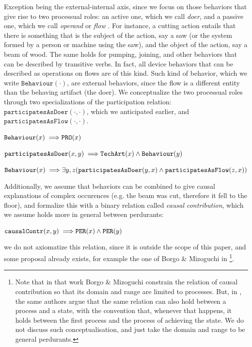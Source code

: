 \documentclass[sw]{iosart2x}
\newcommand{\bflist}{\begin{list}{}{\setlength{\topsep}{2mm}\setlength{\partopsep}{0mm}\setlength{\parsep}{0mm}\setlength{\leftmargin}{9mm}\setlength{\labelwidth}{8mm}}}
\newcommand{\eflist}{\end{list}}
\newcommand{\AxLabel}{\textrm{a}}
\newcounter{cntax}
\newcommand{\myax}[1]{\refstepcounter{cntax}\begin{small}{\bf \AxLabel\thecntax\label{ax:#1}}\end{small}}
\newcommand{\generalStyle}[1]{\texttt{#1}}
\newcommand{\biRel}[3]{\generalStyle{#1}(#2,#3)}
\newcommand{\uniRel}[2]{\generalStyle{#1}(#2)}
\newcommand{\myfi}{\hspace{0.9mm} \Longrightarrow}
\newcommand{\DOLCEProcess}[1]{\uniRel{PRO}{#1}}
\newcommand{\DOLCEPerdurant}[1]{\uniRel{{PER}}{#1}}
\newcommand{\TechArt}[1]{\uniRel{TechArt}{#1}}
\newcommand{\BehaviourConcrete}[1]{\uniRel{Behaviour}{#1}}
\newcommand{\causallyContr}[2]{\biRel{causalContr}{#1}{#2}}
\newcommand{\participateAsDoer}[2]{\biRel{participatesAsDoer}{#1}{#2}}
\newcommand{\participateAsFlow}[2]{\biRel{participatesAsFlow}{#1}{#2}}
\newcommand{\firstTimeKeyWord}[1]{\textit{#1}}
\begin{document}
Exception being the external-internal axis, since we focus on those behaviors that give rise to two processual roles: an active one, which we call \firstTimeKeyWord{doer}, and a passive one, which we call \firstTimeKeyWord{operand} or \firstTimeKeyWord{flow} \cite{pahl_engineering_2007}. 
For instance, a cutting action entails that there is something that is the subject of the action, say a saw (or the system formed by a person or machine using the saw), and the object of the action, say a beam of wood.
The same holds for pumping, joining, and other behaviors that can be described by transitive verbs. 
In fact, all device behaviors that can be described as operations on flows are of this kind. 
Such kind of behavior, which we write $\BehaviourConcrete{\cdot}$, are external behaviors, since the flow is a different entity than the behaving artifact (the doer).
We conceptualize the two processual roles through two specializations of the participation relation: $\participateAsDoer{\cdot}{\cdot}$, which we anticipated earlier, and $\participateAsFlow{\cdot}{\cdot}$. 
\bflist
  \item[\myax{behaviorSubsum}] $ \BehaviourConcrete{x} \myfi \DOLCEProcess{x} $
  \item[\myax{participateAsDoerRage}]  $ \participateAsDoer{x}{y} \myfi \TechArt{x} \land \BehaviourConcrete{y} $
  \item[\myax{processualRoles}] $ \BehaviourConcrete{x} \myfi \exists y,z(\participateAsDoer{y}{x} \land \participateAsFlow{z}{x}) $ 
\eflist

Additionally, we assume that behaviors can be combined to give causal explanations of complex occurences (e.g. the beam was cut, therefore it fell to the floor), and formalize this with a binary relation called \firstTimeKeyWord{causal contribution}, which we assume holds more in general between perdurants:
\bflist
  \item[\myax{contribRange}] $ \causallyContr{x}{y} \myfi \DOLCEPerdurant{x} \land \DOLCEPerdurant{y} $
\eflist
we do not axiomatize this relation, since it is outside the scope of this paper, and some proposal already exists, for example the one of Borgo \& Mizoguchi in \cite{borgoFirstorderFormalizationEvent2014}\footnote{Note that in that work Borgo \& Mizoguchi constrain the relation of causal contribution so that its domain and range are limited to processes. But, in \cite{mizoguchiUnifyingDefinitionArtifact2016}, the same authors argue that the same relation can also hold between a process and a state, with the convention that, whenever that happens, it holds between the first process and the process of achieving the state.
We do not discuss such conceptualisation, and just take the domain and range to be general perdurants.}.
\end{document}
